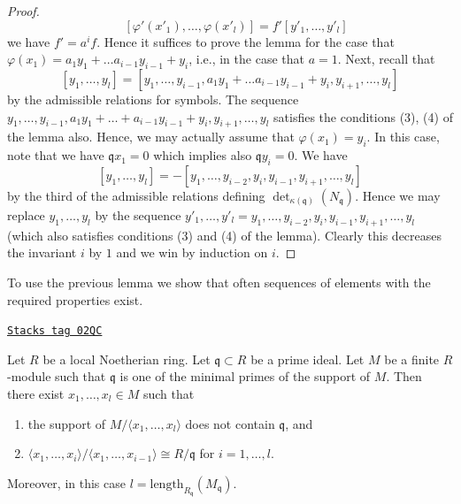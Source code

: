 \begin{proof}
$$\quad
[\varphi'(x'_1), \ldots, \varphi(x'_l)] = f' [y'_1, \ldots, y'_l]
$$
we have $f' = a^if$. Hence it suffices to prove the lemma for the
case that $\varphi(x_1) = a_1y_1 + \ldots a_{i - 1}y_{i - 1} + y_i$,
i.e., in the case that $a = 1$. Next, recall that
$$
[y_1, \ldots, y_l] = [y_1, \ldots, y_{i - 1},
a_1y_1 + \ldots a_{i - 1}y_{i - 1} + y_i, y_{i + 1}, \ldots, y_l]
$$
by the admissible relations for symbols. The sequence
$y_1, \ldots, y_{i - 1},
a_1y_1 + \ldots + a_{i - 1}y_{i - 1} + y_i, y_{i + 1}, \ldots, y_l$
satisfies the conditions (3), (4) of the lemma also.
Hence, we may actually
assume that $\varphi(x_1) = y_i$. In this case, note that we have
$\mathfrak q x_1 = 0$ which implies also $\mathfrak q y_i = 0$.
We have
$$
[y_1, \ldots, y_l] =
- [y_1, \ldots, y_{i - 2}, y_i, y_{i - 1}, y_{i + 1}, \ldots, y_l]
$$
by the third of the admissible relations defining
$\det_{\kappa(\mathfrak q)}(N_{\mathfrak q})$. Hence we may
replace $y_1, \ldots, y_l$ by
the sequence
$y'_1, \ldots, y'_l =
y_1, \ldots, y_{i - 2}, y_i, y_{i - 1}, y_{i + 1}, \ldots, y_l$
(which also satisfies conditions (3) and (4) of the lemma).
Clearly this decreases the invariant $i$ by $1$ and we win by induction
on $i$.
\end{proof}

To use the previous lemma we show that often sequences of elements
with the required properties exist.

\begin{lemma}
\label{chow-lemma-good-sequence-exists}
\href{https://stacks.math.columbia.edu/tag/02QC}{\texttt{Stacks tag 02QC}}

Let $R$ be a local Noetherian ring.
Let $\mathfrak q \subset R$ be a prime ideal.
Let $M$ be a finite $R$-module such that
$\mathfrak q$ is one of the minimal primes of the support of $M$.
Then there exist $x_1, \ldots, x_l \in M$ such that
\begin{enumerate}
\item the support of $M / \langle x_1, \ldots, x_l\rangle$ does not contain
$\mathfrak q$, and
\item $\langle x_1, \ldots, x_i\rangle / \langle x_1, \ldots, x_{i - 1}\rangle
\cong R/\mathfrak q$ for $i = 1, \ldots, l$.
\end{enumerate}
Moreover, in this case $l = \text{length}_{R_\mathfrak q}(M_\mathfrak q)$.
\end{lemma}

